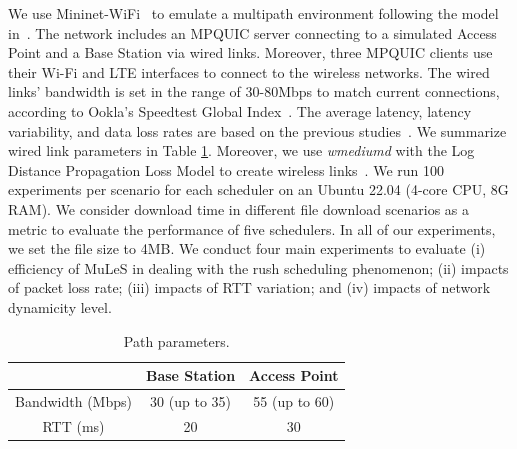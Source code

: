 We use Mininet-WiFi~\cite{mininetwifi} to emulate a multipath environment following the model in~. The network includes an MPQUIC server connecting to a simulated Access Point and a Base Station via wired links. Moreover, three MPQUIC clients use their Wi-Fi and LTE interfaces to connect to the wireless networks. The wired links' bandwidth is set in the range of 30-80Mbps to match current connections, according to Ookla's Speedtest Global Index~\cite{speedtest}. The average latency, latency variability, and data loss rates are based on the previous studies~\cite{microsoft,wifi,4g}. We summarize wired link parameters in Table \ref{tab1}. Moreover, we use \textit{wmediumd} with the Log Distance Propagation Loss Model to create wireless links~\cite{10.1145/3568562.3568654}. We run 100 experiments per scenario for each scheduler on an Ubuntu 22.04 (4-core CPU, 8G RAM). We consider download time in different file download scenarios as a metric to evaluate the performance of five schedulers. 
In all of our experiments, we set the file size to 4MB. We conduct four main experiments to evaluate (i) efficiency of MuLeS in dealing with the rush scheduling phenomenon; (ii) impacts of packet loss rate; (iii) impacts of RTT variation; and (iv) impacts of network dynamicity level.

\begin{table}[t]
\begin{center}
\caption{Path parameters.}
\label{tab1}
\begin{tabular}{|c|c|c|}
\hline
\textbf{} & \textbf{Base Station}& \textbf{Access Point} \\
\hline
Bandwidth (Mbps)& 30 (up to 35)& 55 (up to 60)   \\
\hline
RTT (ms)& 20& 30  \\
\hline
\end{tabular}
\end{center}
\end{table}


